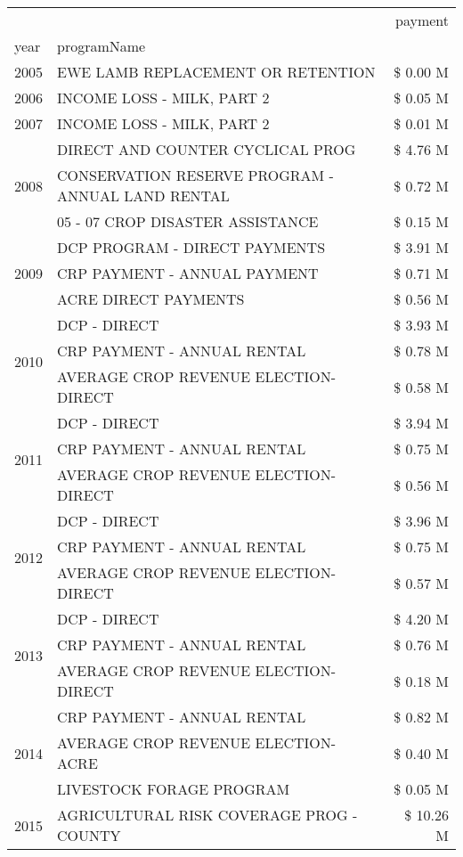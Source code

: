 \begin{tabular}{llr}
\toprule
 &  & payment \\
year & programName &  \\
\midrule
2005 & EWE LAMB REPLACEMENT OR RETENTION & \$ 0.00 M \\
\cline{1-3}
2006 & INCOME LOSS - MILK, PART 2 & \$ 0.05 M \\
\cline{1-3}
2007 & INCOME LOSS - MILK, PART 2 & \$ 0.01 M \\
\cline{1-3}
\multirow[t]{3}{*}{2008} & DIRECT AND COUNTER CYCLICAL PROG & \$ 4.76 M \\
 & CONSERVATION RESERVE PROGRAM - ANNUAL LAND RENTAL & \$ 0.72 M \\
 & 05 - 07 CROP DISASTER ASSISTANCE & \$ 0.15 M \\
\cline{1-3}
\multirow[t]{3}{*}{2009} & DCP PROGRAM - DIRECT PAYMENTS & \$ 3.91 M \\
 & CRP PAYMENT - ANNUAL PAYMENT & \$ 0.71 M \\
 & ACRE DIRECT PAYMENTS & \$ 0.56 M \\
\cline{1-3}
\multirow[t]{3}{*}{2010} & DCP - DIRECT & \$ 3.93 M \\
 & CRP PAYMENT - ANNUAL RENTAL & \$ 0.78 M \\
 & AVERAGE CROP REVENUE ELECTION-DIRECT & \$ 0.58 M \\
\cline{1-3}
\multirow[t]{3}{*}{2011} & DCP - DIRECT & \$ 3.94 M \\
 & CRP PAYMENT - ANNUAL RENTAL & \$ 0.75 M \\
 & AVERAGE CROP REVENUE ELECTION-DIRECT & \$ 0.56 M \\
\cline{1-3}
\multirow[t]{3}{*}{2012} & DCP - DIRECT & \$ 3.96 M \\
 & CRP PAYMENT - ANNUAL RENTAL & \$ 0.75 M \\
 & AVERAGE CROP REVENUE ELECTION-DIRECT & \$ 0.57 M \\
\cline{1-3}
\multirow[t]{3}{*}{2013} & DCP - DIRECT & \$ 4.20 M \\
 & CRP PAYMENT - ANNUAL RENTAL & \$ 0.76 M \\
 & AVERAGE CROP REVENUE ELECTION-DIRECT & \$ 0.18 M \\
\cline{1-3}
\multirow[t]{3}{*}{2014} & CRP PAYMENT - ANNUAL RENTAL & \$ 0.82 M \\
 & AVERAGE CROP REVENUE ELECTION-ACRE & \$ 0.40 M \\
 & LIVESTOCK FORAGE PROGRAM & \$ 0.05 M \\
\cline{1-3}
\multirow[t]{3}{*}{2015} & AGRICULTURAL RISK COVERAGE PROG - COUNTY & \$ 10.26 M \\

\end{tabular}
